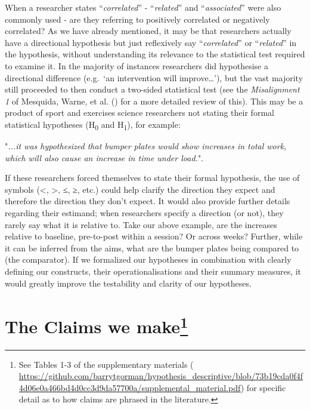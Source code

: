 \documentclass[
]{article}
\begin{document}
When a researcher states ``\emph{correlated}'' - ``\emph{related}'' and
``\emph{associated}'' were also commonly used - are they referring to
positively correlated or negatively correlated? As we have already
mentioned, it may be that researchers actually have a directional
hypothesis but just reflexively say ``\emph{correlated}'' or
``\emph{related}'' in the hypothesis, without understanding its
relevance to the statistical test required to examine it. In the
majority of instances researchers did hypothesise a directional
difference (e.g.~`an intervention will improve\ldots{}'), but the vast
majority still proceeded to then conduct a two-sided statistical test
(see the \emph{Misalignment 1} of Mesquida, Warne, et al.
() for a more detailed review of
this). This may be a product of sport and exercises science researchers
not stating their formal statistical hypotheses (H\textsubscript{0} and
H\textsubscript{1}), for example:

\begin{center}


"\textit{...it was hypothesized that bumper plates would show increases in total work, which will also cause an increase in time under load.}".


\end{center}

If these researchers forced themselves to state their formal hypothesis,
the use of symbols (\textless, \textgreater, ≤, ≥, etc.) could help
clarify the direction they expect and therefore the direction they don't
expect. It would also provide further details regarding their estimand;
when researchers specify a direction (or not), they rarely say what it
is relative to. Take our above example, are the increases relative to
baseline, pre-to-post within a session? Or across weeks? Further, while
it can be inferred from the aims, what are the bumper plates being
compared to (the comparator). If we formalized our hypotheses in
combination with clearly defining our constructs, their
operationalisations and their summary measures, it would greatly improve
the testability and clarity of our hypotheses.

\section[The Claims we make]{\texorpdfstring{The Claims we
make\footnote{See Tables 1-3 of the supplementary materials (
  \url{https://github.com/barrytgorman/hypothesis_descriptive/blob/73b19cda0f4f4d06e0a466bd4d0cc3d9da57700a/supplemental_material.pdf})
  for specific detail as to how claims are phrased in the literature.}}{The Claims we make}}\label{the-claims-we-make6}
\end{document}
